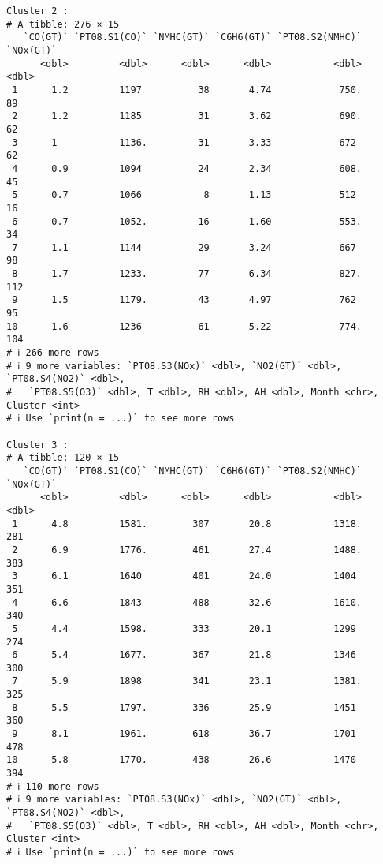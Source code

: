 \documentclass{article}
\begin{document}
\begin{itemize}
\begin{verbatim}
Cluster 2 :
# A tibble: 276 × 15
   `CO(GT)` `PT08.S1(CO)` `NMHC(GT)` `C6H6(GT)` `PT08.S2(NMHC)` `NOx(GT)`
      <dbl>         <dbl>      <dbl>      <dbl>           <dbl>     <dbl>
 1      1.2         1197          38       4.74            750.        89
 2      1.2         1185          31       3.62            690.        62
 3      1           1136.         31       3.33            672         62
 4      0.9         1094          24       2.34            608.        45
 5      0.7         1066           8       1.13            512         16
 6      0.7         1052.         16       1.60            553.        34
 7      1.1         1144          29       3.24            667         98
 8      1.7         1233.         77       6.34            827.       112
 9      1.5         1179.         43       4.97            762         95
10      1.6         1236          61       5.22            774.       104
# ℹ 266 more rows
# ℹ 9 more variables: `PT08.S3(NOx)` <dbl>, `NO2(GT)` <dbl>, `PT08.S4(NO2)` <dbl>,
#   `PT08.S5(O3)` <dbl>, T <dbl>, RH <dbl>, AH <dbl>, Month <chr>, Cluster <int>
# ℹ Use `print(n = ...)` to see more rows

Cluster 3 :
# A tibble: 120 × 15
   `CO(GT)` `PT08.S1(CO)` `NMHC(GT)` `C6H6(GT)` `PT08.S2(NMHC)` `NOx(GT)`
      <dbl>         <dbl>      <dbl>      <dbl>           <dbl>     <dbl>
 1      4.8         1581.        307       20.8           1318.       281
 2      6.9         1776.        461       27.4           1488.       383
 3      6.1         1640         401       24.0           1404        351
 4      6.6         1843         488       32.6           1610.       340
 5      4.4         1598.        333       20.1           1299        274
 6      5.4         1677.        367       21.8           1346        300
 7      5.9         1898         341       23.1           1381.       325
 8      5.5         1797.        336       25.9           1451        360
 9      8.1         1961.        618       36.7           1701        478
10      5.8         1770.        438       26.6           1470        394
# ℹ 110 more rows
# ℹ 9 more variables: `PT08.S3(NOx)` <dbl>, `NO2(GT)` <dbl>, `PT08.S4(NO2)` <dbl>,
#   `PT08.S5(O3)` <dbl>, T <dbl>, RH <dbl>, AH <dbl>, Month <chr>, Cluster <int>
# ℹ Use `print(n = ...)` to see more rows


\end{verbatim}
\end{itemize}
\end{document}

